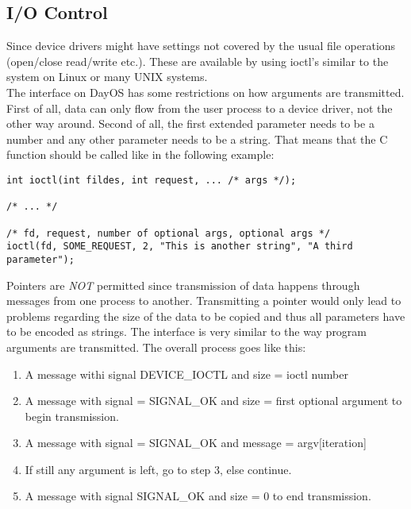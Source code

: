 \subsection{I/O Control}
Since device drivers might have settings not covered by the usual file operations (open/close read/write etc.).
These are available by using ioctl's similar to the system on Linux or many UNIX systems. \\
The interface on DayOS has some restrictions on how arguments are transmitted.
First of all, data can only flow from the user process to a device driver, not the other way around.
Second of all, the first extended parameter needs to be a number
and any other parameter needs to be a string. That means that the C function should be called
like in the following example:
\begin{verbatim}
int ioctl(int fildes, int request, ... /* args */);

/* ... */

/* fd, request, number of optional args, optional args */
ioctl(fd, SOME_REQUEST, 2, "This is another string", "A third parameter");
\end{verbatim}
Pointers are \emph{NOT} permitted since transmission of data happens through messages
from one process to another. Transmitting a pointer would only lead to problems regarding
the size of the data to be copied and thus all parameters have to be encoded as strings.
The interface is very similar to the way program arguments are transmitted.
The overall process goes like this:
\begin{enumerate}
 \item A message withi signal DEVICE\_IOCTL and size = ioctl number
 \item A message with signal = SIGNAL\_OK and size = first optional argument to begin transmission.
 \item A message with signal = SIGNAL\_OK and message = argv[iteration]
 \item If still any argument is left, go to step 3, else continue.
 \item A message with signal SIGNAL\_OK and size = 0 to end transmission.
\end{enumerate}